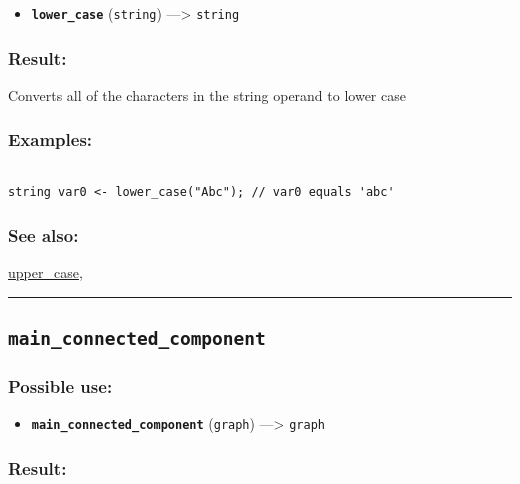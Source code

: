 \documentclass[]{book}
\providecommand{\tightlist}{%
  \setlength{\itemsep}{0pt}\setlength{\parskip}{0pt}}
\theoremstyle{definition}
\theoremstyle{definition}
\theoremstyle{definition}
\theoremstyle{remark}
\begin{document}
\begin{itemize}
\tightlist
\item
  \textbf{\texttt{lower\_case}} (\texttt{string}) ---\textgreater{}
  \texttt{string}
\end{itemize}

\subsubsection{Result:}\label{result-321}

Converts all of the characters in the string operand to lower case

\subsubsection{Examples:}\label{examples-229}

\begin{verbatim}
 
string var0 <- lower_case("Abc"); // var0 equals 'abc'
\end{verbatim}

\subsubsection{See also:}\label{see-also-130}

\href{operators-s-to-z.html\#upper_case}{upper\_case},

\begin{center}\rule{0.5\linewidth}{\linethickness}\end{center}

\subsection{\texorpdfstring{\texttt{main\_connected\_component}}{main\_connected\_component}}\label{main_connected_component}

\subsubsection{Possible use:}\label{possible-use-332}

\begin{itemize}
\tightlist
\item
  \textbf{\texttt{main\_connected\_component}} (\texttt{graph})
  ---\textgreater{} \texttt{graph}
\end{itemize}

\subsubsection{Result:}\label{result-322}
\end{document}
